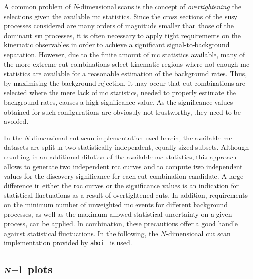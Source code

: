 A common problem of $N$-dimensional scans is the concept of \textit{overtightening} the selections given the available \gls{mc} statistics.
Since the cross sections of the \gls{susy} processes considered are many orders of magnitude smaller than those of the dominant \gls{sm} processes, it is often necessary to apply tight requirements on the kinematic observables in order to achieve a significant signal-to-background separation.
However, due to the finite amount of \gls{mc} statistics available, many of the more extreme cut combinations select kinematic regions where not enough \gls{mc} statistics are available for a reasonable estimation of the background rates.
Thus, by maximising the background rejection, it may occur that cut combinations are selected where the mere lack of \gls{mc} statistics, needed to properly estimate the background rates, causes a high significance value.
As the significance values obtained for such configurations are obviosuly not trustworthy, they need to be avoided. 

In the $N$-dimensional cut scan implementation used herein, the available \gls{mc} datasets are split in two statistically independent, equally sized subsets. Although resulting in an additional dilution of the available \gls{mc} statistics, this approach allows to generate two independent \gls{roc} curves and  to compute two independent values for the discovery significance for each cut combination candidate. A large difference in either the \gls{roc} curves or the significance values is an indication for statistical fluctuations as a result of overtightened cuts. In addition, requirements on the minimum number of unweighted \gls{mc} events for different background processes, as well as the maximum allowed statistical uncertainty on a given process, can be applied. In combination, these precautions offer a good handle against statistical fluctuations. In the following, the $N$-dimensional cut scan implementation provided by \texttt{ahoi}~\cite{ahoi} is used.

\subsection[\textit{N}--1]{$\makemebold{N}$--1 plots}\label{sec:n-1-scan}

